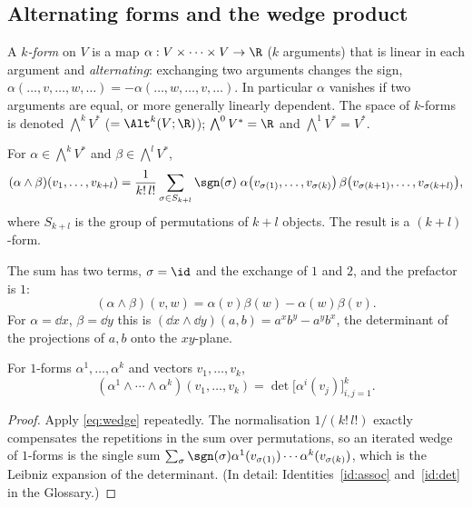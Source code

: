 \subsection{Alternating forms and the wedge product}\label{sec:altforms}

\begin{definition}
A \emph{$k$-form} on $V$ is a map $\alpha:V\times\cdots\times V\to\R$ ($k$ arguments) that is linear in each argument and
\emph{alternating}: exchanging two arguments changes the sign,
$\alpha(\dots,v,\dots,w,\dots)=-\alpha(\dots,w,\dots,v,\dots)$. In particular $\alpha$ vanishes if two arguments are equal,
or more generally linearly dependent. The space of $k$-forms is denoted $\bigwedge^kV^*$ ($=\Alt^k(V;\R)$); $\bigwedge^0V^*=\R$ and
$\bigwedge^1V^*=V^*$.
\end{definition}

\begin{definition}
For $\alpha\in\bigwedge^kV^*$ and $\beta\in\bigwedge^lV^*$,
\begin{equation}\label{eq:wedge}
(\alpha\wedge\beta)(v_1,\dots,v_{k+l})=\frac1{k!\,l!}\sum_{\sigma\in S_{k+l}}\sgn(\sigma)\;
\alpha\bigl(v_{\sigma(1)},\dots,v_{\sigma(k)}\bigr)\,\beta\bigl(v_{\sigma(k+1)},\dots,v_{\sigma(k+l)}\bigr),
\end{equation}
where $S_{k+l}$ is the group of permutations of $k+l$ objects. The result is a $(k+l)$-form.
\end{definition}

\begin{specialcase}[$k=l=1$: the case that matters most]
The sum has two terms, $\sigma=\id$ and the exchange of $1$ and $2$, and the prefactor is $1$:
\begin{equation}\label{eq:wedge11}
(\alpha\wedge\beta)(v,w)=\alpha(v)\beta(w)-\alpha(w)\beta(v).
\end{equation}
For $\alpha=\dd x$, $\beta=\dd y$ this is $(\dd x\wedge\dd y)(a,b)=a^xb^y-a^yb^x$, the determinant of the projections of
$a,b$ onto the $xy$-plane.
\end{specialcase}

\begin{proposition}\label{prop:detformula}
For $1$-forms $\alpha^1,\dots,\alpha^k$ and vectors $v_1,\dots,v_k$,
\begin{equation}\label{eq:detformula}
(\alpha^1\wedge\cdots\wedge\alpha^k)(v_1,\dots,v_k)=\det\bigl[\alpha^i(v_j)\bigr]_{i,j=1}^k .
\end{equation}
\end{proposition}
\begin{proof}
Apply \eqref{eq:wedge} repeatedly. The normalisation $1/(k!\,l!)$ exactly compensates the repetitions in the sum over
permutations, so an iterated wedge of $1$-forms is the single sum $\sum_\sigma\sgn(\sigma)\alpha^1(v_{\sigma(1)})\cdots\alpha^k(v_{\sigma(k)})$,
which is the Leibniz expansion of the determinant. (In detail: Identities~\ref{id:assoc} and~\ref{id:det} in the Glossary.)%
\end{proof}

